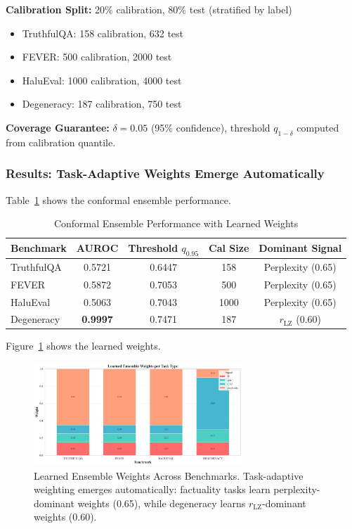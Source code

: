 \documentclass[10pt]{article}
\begin{document}
\textbf{Calibration Split:} 20\% calibration, 80\% test (stratified by label)
\begin{itemize}
\item TruthfulQA: 158 calibration, 632 test
\item FEVER: 500 calibration, 2000 test
\item HaluEval: 1000 calibration, 4000 test
\item Degeneracy: 187 calibration, 750 test
\end{itemize}

\textbf{Coverage Guarantee:} $\delta = 0.05$ (95\% confidence), threshold $q_{1-\delta}$ computed from calibration quantile.

\subsubsection{Results: Task-Adaptive Weights Emerge Automatically}

Table~\ref{tab:conformal-results} shows the conformal ensemble performance.

\begin{table}[h]
\centering
\caption{Conformal Ensemble Performance with Learned Weights}
\label{tab:conformal-results}
\begin{tabular}{lcccc}
\toprule
\textbf{Benchmark} & \textbf{AUROC} & \textbf{Threshold} $q_{0.95}$ & \textbf{Cal Size} & \textbf{Dominant Signal} \\
\midrule
TruthfulQA  & 0.5721 & 0.6447 & 158  & Perplexity (0.65) \\
FEVER       & 0.5872 & 0.7053 & 500  & Perplexity (0.65) \\
HaluEval    & 0.5063 & 0.7043 & 1000 & Perplexity (0.65) \\
Degeneracy  & \textbf{0.9997} & 0.7471 & 187  & $r_{\text{LZ}}$ (0.60) \\
\bottomrule
\end{tabular}
\end{table}

Figure~\ref{fig:conformal-weights} shows the learned weights.

\begin{figure}[h]
\centering
\includegraphics[width=0.7\textwidth]{../../figures/ensemble_weights_comparison.png}
\caption{Learned Ensemble Weights Across Benchmarks. Task-adaptive weighting emerges automatically: factuality tasks learn perplexity-dominant weights (0.65), while degeneracy learns $r_{\text{LZ}}$-dominant weights (0.60).}
\label{fig:conformal-weights}
\end{figure}
\end{document}
